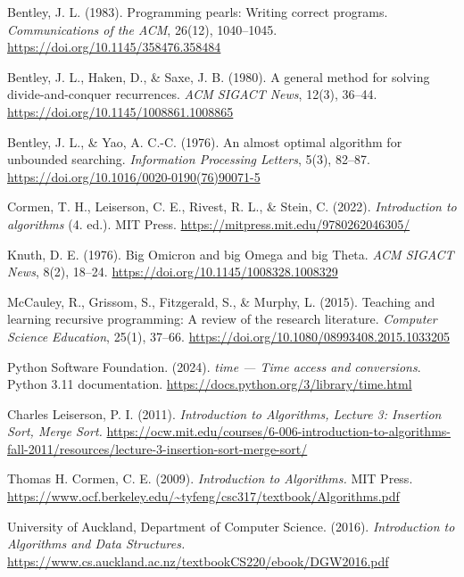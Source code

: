 \documentclass[12pt,a4paper]{article}
\begin{document}
\begin{list}{}{%
  \setlength{\leftmargin}{1.27cm}
  \setlength{\itemindent}{-1.27cm}
  \setlength{\itemsep}{8pt}}
\item Bentley, J. L. (1983). Programming pearls: Writing correct programs.
\textit{Communications of the ACM}, 26(12), 1040--1045.
\url{https://doi.org/10.1145/358476.358484}

\item Bentley, J. L., Haken, D., \& Saxe, J. B. (1980). A general method for solving
divide-and-conquer recurrences. \textit{ACM SIGACT News}, 12(3), 36--44.
\url{https://doi.org/10.1145/1008861.1008865}

\item Bentley, J. L., \& Yao, A. C.-C. (1976). An almost optimal algorithm for unbounded
searching. \textit{Information Processing Letters}, 5(3), 82--87.
\url{https://doi.org/10.1016/0020-0190(76)90071-5}

\item Cormen, T. H., Leiserson, C. E., Rivest, R. L., \& Stein, C. (2022).
\textit{Introduction to algorithms} (4.\textordfeminine{} ed.). MIT Press.
\url{https://mitpress.mit.edu/9780262046305/}

\item Knuth, D. E. (1976). Big Omicron and big Omega and big Theta.
\textit{ACM SIGACT News}, 8(2), 18--24. \url{https://doi.org/10.1145/1008328.1008329}

\item McCauley, R., Grissom, S., Fitzgerald, S., \& Murphy, L. (2015). Teaching and
learning recursive programming: A review of the research literature.
\textit{Computer Science Education}, 25(1), 37--66.
\url{https://doi.org/10.1080/08993408.2015.1033205}

\item Python Software Foundation. (2024). \textit{time --- Time access and conversions}.
Python 3.11 documentation. \url{https://docs.python.org/3/library/time.html}

\item Charles Leiserson, P. I. (2011). \textit{Introduction to Algorithms, Lecture 3:
Insertion Sort, Merge Sort.}
\url{https://ocw.mit.edu/courses/6-006-introduction-to-algorithms-fall-2011/resources/lecture-3-insertion-sort-merge-sort/}

\item Thomas H. Cormen, C. E. (2009). \textit{Introduction to Algorithms.} MIT Press.
\url{https://www.ocf.berkeley.edu/~tyfeng/csc317/textbook/Algorithms.pdf}

\item University of Auckland, Department of Computer Science. (2016).
\textit{Introduction to Algorithms and Data Structures.}
\url{https://www.cs.auckland.ac.nz/textbookCS220/ebook/DGW2016.pdf}

\end{list}
\end{document}

